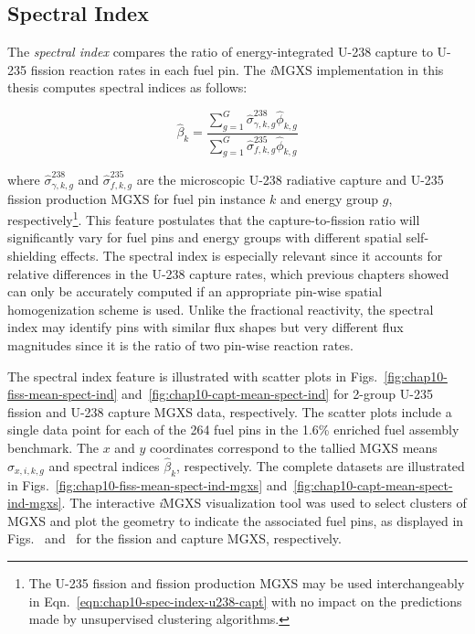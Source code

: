 \clearpage

\subsection{Spectral Index}
\label{subsec:chap10-spec-index}

The \textit{spectral index} compares the ratio of energy-integrated U-238 capture to U-235 fission reaction rates in each fuel pin. The \textit{i}\ac{MGXS} implementation in this thesis computes spectral indices as follows:

\begin{equation}
\label{eqn:chap10-spec-index-u238-capt}
\hat{\beta}_{k} = \frac{\displaystyle\sum\limits_{g=1}^{G}\hat{\sigma}_{\gamma,k,g}^{238}\hat{\phi}_{k,g}}{\displaystyle\sum\limits_{g=1}^{G}\hat{\sigma}_{f,k,g}^{235}\hat{\phi}_{k,g}}
\end{equation}

\noindent where $\hat{\sigma}_{\gamma,k,g}^{238}$ and $\hat{\sigma}_{f,k,g}^{235}$ are the microscopic U-238 radiative capture and U-235 fission production \ac{MGXS} for fuel pin instance $k$ and energy group $g$, respectively\footnote{The U-235 fission and fission production \ac{MGXS} may be used interchangeably in Eqn.~\ref{eqn:chap10-spec-index-u238-capt} with no impact on the predictions made by unsupervised clustering algorithms.}. This feature postulates that the capture-to-fission ratio will significantly vary for fuel pins and energy groups with different spatial self-shielding effects. The spectral index is especially relevant since it accounts for relative differences in the U-238 capture rates, which previous chapters showed can only be accurately computed if an appropriate pin-wise spatial homogenization scheme is used. Unlike the fractional reactivity, the spectral index may identify pins with similar flux shapes but very different flux magnitudes since it is the ratio of two pin-wise reaction rates.

The spectral index feature is illustrated with scatter plots in Figs.~\ref{fig:chap10-fiss-mean-spect-ind} and~\ref{fig:chap10-capt-mean-spect-ind} for 2-group U-235 fission and U-238 capture \ac{MGXS} data, respectively. The scatter plots include a single data point for each of the 264 fuel pins in the 1.6\% enriched fuel assembly benchmark. The $x$ and $y$ coordinates correspond to the tallied \ac{MGXS} means $\hat{\sigma}_{x,i,k,g}$ and spectral indices $\hat{\beta}_{k}$, respectively. The complete datasets are illustrated in Figs.~\ref{fig:chap10-fiss-mean-spect-ind-mgxs} and~\ref{fig:chap10-capt-mean-spect-ind-mgxs}. The interactive \textit{i}\ac{MGXS} visualization tool was used to select clusters of \ac{MGXS} and plot the geometry to indicate the associated fuel pins, as displayed in Figs.~ and~ for the fission and capture \ac{MGXS}, respectively. 


